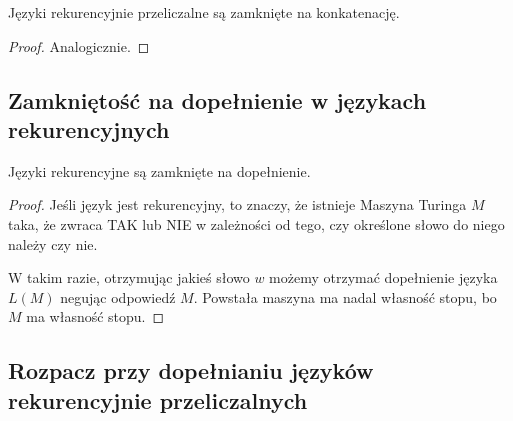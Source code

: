 \begin{theorem}
	Języki rekurencyjnie przeliczalne są zamknięte na konkatenację.
\end{theorem}

\begin{proof}
	Analogicznie.
\end{proof}

\subsection{Zamkniętość na dopełnienie w językach rekurencyjnych}

\begin{theorem}
	\label{recursive-languages-closed-under-complement}
	Języki rekurencyjne są zamknięte na dopełnienie.
\end{theorem}
\begin{proof}
	Jeśli język jest rekurencyjny, to znaczy, że istnieje Maszyna Turinga \(M\) taka, że zwraca \textsc{TAK} lub \textsc{NIE} w zależności od tego, czy określone słowo do niego należy czy nie.

	W takim razie, otrzymując jakieś słowo \(w\) możemy otrzymać dopełnienie języka \(L(M)\) negując odpowiedź \(M\). Powstała maszyna ma nadal własność stopu, bo \(M\) ma własność stopu.
\end{proof}

\subsection{Rozpacz przy dopełnianiu języków rekurencyjnie przeliczalnych}

